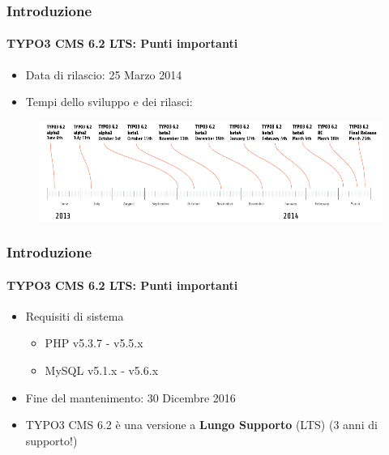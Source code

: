 
\begin{frame}[fragile]

	\frametitle{Introduzione}
	\framesubtitle{TYPO3 CMS 6.2 LTS: Punti importanti}

	\begin{itemize}
		\item Data di rilascio: 25 Marzo 2014
		\item Tempi dello sviluppo e dei rilasci:
	\end{itemize}

	\begin{figure}
		\includegraphics[width=0.99\linewidth]{Images/Introduction/ReleaseTimeline.png}
	\end{figure}

\end{frame}


\begin{frame}[fragile]
	\frametitle{Introduzione}
	\framesubtitle{TYPO3 CMS 6.2 LTS: Punti importanti}

	\begin{itemize}
		\item Requisiti di sistema
		\begin{itemize}
			\item PHP	\tabto{1.2cm} v5.3.7 - v5.5.x
			\item MySQL	\tabto{1.2cm} v5.1.x - v5.6.x
		\end{itemize}
	\end{itemize}

	\begin{itemize}
		\item Fine del mantenimento: 30 Dicembre 2016
		\item TYPO3 CMS 6.2 è una versione a  \textbf{Lungo Supporto} (LTS) (3 anni di supporto!)
	\end{itemize}

\end{frame}

